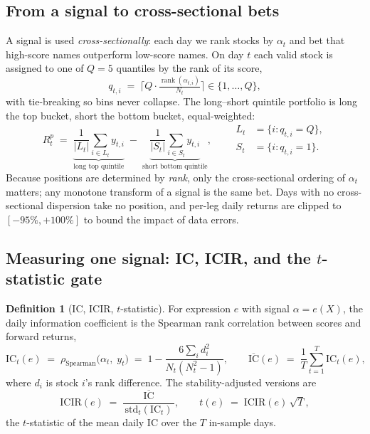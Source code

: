 \documentclass{article}
\theoremstyle{definition}
\newtheorem{definition}{Definition}[section]
\theoremstyle{plain}
\theoremstyle{remark}
\newcommand{\IC}{\mathrm{IC}}
\newcommand{\ICIR}{\mathrm{ICIR}}
\newcommand{\rank}{\operatorname{rank}}
\begin{document}
\subsection{From a signal to cross-sectional bets}
\label{sec:sorting}

A signal is used \emph{cross-sectionally}: each day we rank stocks by $\alpha_t$ and
bet that high-score names outperform low-score names. On day $t$ each valid stock is
assigned to one of $Q=5$ quantiles by the rank of its score,
\[
q_{t,i} \;=\; \Big\lceil Q \cdot \tfrac{\rank(\alpha_{t,i})}{N_t} \Big\rceil \in \{1,\dots,Q\},
\]
with tie-breaking so bins never collapse. The long--short quintile portfolio is long
the top bucket, short the bottom bucket, equal-weighted:
\begin{equation}
R^{p}_{t}
\;=\;
\underbrace{\frac{1}{|L_t|}\sum_{i\in L_t} y_{t,i}}_{\text{long top quintile}}
\;-\;
\underbrace{\frac{1}{|S_t|}\sum_{i\in S_t} y_{t,i}}_{\text{short bottom quintile}},
\qquad
\begin{aligned}
L_t &= \{i: q_{t,i}=Q\},\\
S_t &= \{i: q_{t,i}=1\}.
\end{aligned}
\label{eq:lsret}
\end{equation}
Because positions are determined by \emph{rank}, only the cross-sectional ordering of
$\alpha_t$ matters; any monotone transform of a signal is the same bet. Days with no
cross-sectional dispersion take no position, and per-leg daily returns are clipped to
$[-95\%, +100\%]$ to bound the impact of data errors.

\subsection{Measuring one signal: IC, ICIR, and the $t$-statistic gate}
\label{sec:ic}

\begin{definition}[IC, ICIR, $t$-statistic]
For expression $e$ with signal $\alpha=e(X)$, the daily information coefficient is the
Spearman rank correlation between scores and forward returns,
\begin{equation}
\IC_t(e) \;=\; \rho_{\text{Spearman}}\!\big(\alpha_t,\; y_t\big)
\;=\; 1 - \frac{6\sum_i d_i^2}{N_t(N_t^2-1)},
\qquad
\overline{\IC}(e) \;=\; \frac{1}{T}\sum_{t=1}^{T}\IC_t(e),
\label{eq:ic}
\end{equation}
where $d_i$ is stock $i$'s rank difference. The stability-adjusted versions are
\begin{equation}
\ICIR(e) \;=\; \frac{\overline{\IC}}{\,\mathrm{std}_t(\IC_t)\,},
\qquad
t(e) \;=\; \ICIR(e)\,\sqrt{T},
\label{eq:icir}
\end{equation}
the $t$-statistic of the mean daily IC over the $T$ in-sample days.
\end{definition}
\end{document}
